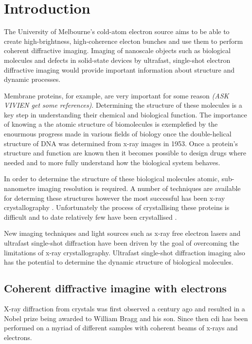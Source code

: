 \section{Introduction}

The University of Melbourne's cold-atom electron source aims to be able to create high-brightness, high-coherence electon bunches and use them to perform coherent diffractive imaging. Imaging of nanoscale objects such as biological molecules\cite{dwyer_femtosecond_2006, williamson_clocking_1997} and defects in solid-state devices\cite{siwick_atomic-level_2003} by ultrafast, single-shot electron diffractive imaging would provide important information about structure and dynamic processes.

Membrane proteins, for example, are very important for some reason \emph{(ASK VIVIEN get some references)}. Determining the structure of these molecules is a key step in understanding their chemical and biological function. The importance of knowing a the atomic structure of biomolecules is exemplefied by the enourmous progress made in various fields of biology once the double-helical structure of DNA was determined from x-ray images in 1953\cite{watson_molecular_1953}. Once a protein's structure and function are known then it becomes possible to design drugs\cite{pinto_influenza_1992} where needed and to more fully understand how the biological system behaves.

In order to determine the structure of these biological molecules atomic, sub-nanometre imaging resolution is required. A number of techniques are available for determing these structures \cite{nettleship_methods_2008, svergun_small-angle_2003, opella_structure_2004} however the most successful has been x-ray crystallography \cite{kendrew_three-dimensional_1958, uson_advances_1999}. Unfortunately the process of crystallising these proteins is difficult and to date relatively few have been crystallised \cite{geerlof_impact_2006}.

New imaging techniques and light sources such as x-ray free electron lasers and  ultrafast single-shot diffraction have been driven by the goal of overcoming the limitations of x-ray crystallography. Ultrafast single-shot diffraction imaging also has the potential to determine the dynamic structure of biological molecules.

\subsection{Coherent diffractive imagine with electrons}
X-ray diffraction from crystals was first observed a century ago\cite{bragg_x-rays_1912} and resulted in a Nobel prize being awarded to William Bragg and his son. Since then \gls{cdi} has been performed on a myriad of different samples with coherent beams of x-rays and electrons.

